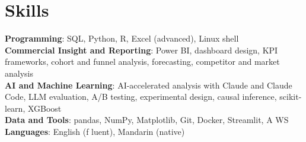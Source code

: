 \documentclass[letterpaper,11pt]{article}
\begin{document}
\section{\textbf{Skills}}
 \begin{itemize}[leftmargin=0.15in, label={}]
    \small{\item{
     \textbf{Programming}{: SQL, Python, R, Excel (advanced), Linux shell} \\
     \textbf{Commercial Insight and Reporting}{: Power BI, dashboard design, KPI frameworks, cohort and funnel analysis, forecasting, competitor and market analysis} \\
     \textbf{AI and Machine Learning}{: AI-accelerated analysis with Claude and Claude Code, LLM evaluation, A/B testing, experimental design, causal inference, scikit-learn, XGBoost} \\
     \textbf{Data and Tools}{: pandas, NumPy, Matplotlib, Git, Docker, Streamlit, A\kern0pt WS} \\
     \textbf{Languages}{: English (f\kern0pt luent), Mandarin (native)}}}

 \end{itemize}
\end{document}
